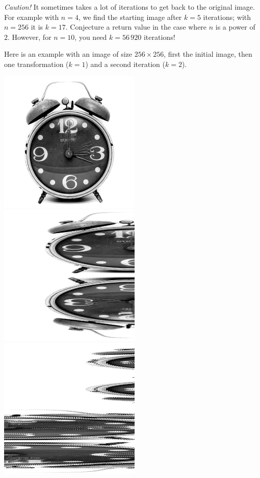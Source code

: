 \documentclass[11pt,class=report,crop=false]{standalone}
\begin{document}
\begin{activite}
\begin{enumerate}
  \emph{Caution!} It sometimes takes a lot of iterations to get back to the original image. For example with $n=4$, we find the starting image after $k=5$ iterations; with $n=256$ it is $k=17$. Conjecture a return value in the case where $n$ is a power of $2$. However, for $n=10$, you need $k = 56\,920$ iterations!
   
  
\end{enumerate}

Here is an example with an image of size $256 \times 256$, first the initial image, then one transformation ($k=1$) and a second iteration ($k=2$).
\begin{center}
\includegraphics[scale=\myscale,scale=0.4]{images_chapter/clock_gimp_new_baker_0.png}\qquad
\includegraphics[scale=\myscale,scale=0.4]{images_chapter/clock_gimp_new_baker_1.png}\qquad
\includegraphics[scale=\myscale,scale=0.4]{images_chapter/clock_gimp_new_baker_2.png}

\end{center}
\end{activite}
\end{document}
